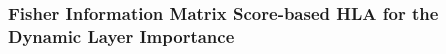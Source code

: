 \documentclass[lettersize,journal]{IEEEtran}
\begin{document}
%



\subsubsection{Fisher Information Matrix Score-based HLA for the Dynamic Layer Importance}\label{sec:FIM-HLA} 
\end{document}
